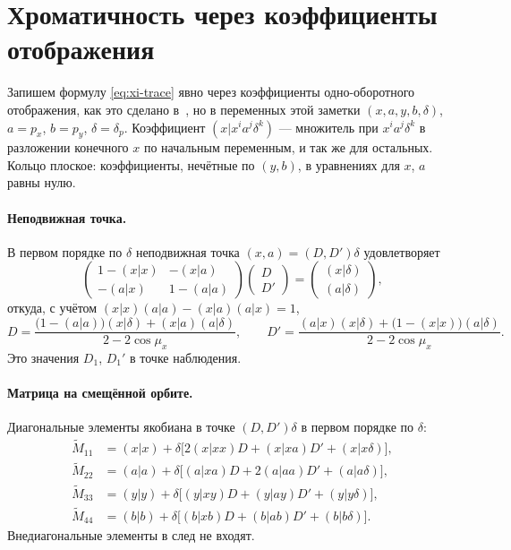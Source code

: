 \section{Хроматичность через коэффициенты отображения}
\label{app:map}

Запишем формулу \eqref{eq:xi-trace} явно через коэффициенты одно-оборотного отображения, как это сделано в~\cite{ValetovPhD,ValetovChrom2026}, но в переменных этой заметки $(x,a,y,b,\delta)$, $a=p_x$, $b=p_y$, $\delta=\delta_p$. Коэффициент $(x|x^ia^j\delta^k)$ --- множитель при $x^ia^j\delta^k$ в разложении конечного $x$ по начальным переменным, и так же для остальных. Кольцо плоское: коэффициенты, нечётные по $(y,b)$, в уравнениях для $x$, $a$ равны нулю.

\paragraph{Неподвижная точка.}
В первом порядке по $\delta$ неподвижная точка $(x,a)=(D,D')\delta$ удовлетворяет
\begin{equation}
\label{eq:app-fp}
\begin{pmatrix}1-(x|x)&-(x|a)\\-(a|x)&1-(a|a)\end{pmatrix}
\begin{pmatrix}D\\D'\end{pmatrix}
=\begin{pmatrix}(x|\delta)\\(a|\delta)\end{pmatrix},
\end{equation}
откуда, с учётом $(x|x)(a|a)-(x|a)(a|x)=1$,
\begin{equation}
\label{eq:app-D}
D=\frac{\bigl(1-(a|a)\bigr)(x|\delta)+(x|a)(a|\delta)}{2-2\cos\mu_x},
\qquad
D'=\frac{(a|x)(x|\delta)+\bigl(1-(x|x)\bigr)(a|\delta)}{2-2\cos\mu_x}.
\end{equation}
Это значения $D_1$, $D_1'$ в точке наблюдения.

\paragraph{Матрица на смещённой орбите.}
Диагональные элементы якобиана в точке $(D,D')\delta$ в первом порядке по $\delta$:
\begin{align}
\tilde M_{11}&=(x|x)+\delta\bigl[2(x|xx)D+(x|xa)D'+(x|x\delta)\bigr],\\
\tilde M_{22}&=(a|a)+\delta\bigl[(a|xa)D+2(a|aa)D'+(a|a\delta)\bigr],\\
\tilde M_{33}&=(y|y)+\delta\bigl[(y|xy)D+(y|ay)D'+(y|y\delta)\bigr],\\
\tilde M_{44}&=(b|b)+\delta\bigl[(b|xb)D+(b|ab)D'+(b|b\delta)\bigr].
\end{align}
Внедиагональные элементы в след не входят.

